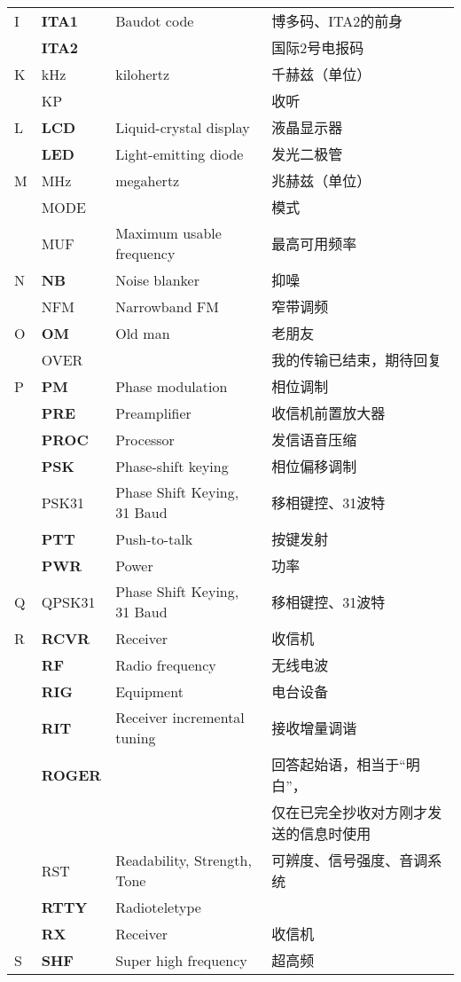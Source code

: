 \begin{longtable}[l]{llll}
I & \textbf{ITA1} & Baudot code & 博多码、ITA2的前身 \\
& \textbf{ITA2} & & 国际2号电报码 \\
K & kHz & kilohertz & 千赫兹（单位） \\
& KP & & 收听 \\
L & \textbf{LCD} & Liquid-crystal display & 液晶显示器 \\
& \textbf{LED} & Light-emitting diode & 发光二极管 \\
M & MHz & megahertz & 兆赫兹（单位） \\
& MODE & & 模式 \\
& MUF & Maximum usable frequency & 最高可用频率 \\
N & \textbf{NB} & Noise blanker & 抑噪 \\
& NFM & Narrowband FM & 窄带调频 \\
O & \textbf{OM} & Old man & 老朋友 \\%
& OVER & & 我的传输已结束，期待回复 \\
P & \textbf{PM} & Phase modulation & 相位调制 \\
& \textbf{PRE} & Preamplifier & 收信机前置放大器 \\
& \textbf{PROC} & Processor & 发信语音压缩 \\
& \textbf{PSK} & Phase-shift keying & 相位偏移调制 \\
& PSK31 & Phase Shift Keying, 31 Baud & 移相键控、31波特 \\
& \textbf{PTT} & Push-to-talk & 按键发射 \\
& \textbf{PWR} & Power & 功率 \\
Q & QPSK31 & Phase Shift Keying, 31 Baud & 移相键控、31波特 \\
R & \textbf{RCVR} & Receiver & 收信机 \\
& \textbf{RF} & Radio frequency & 无线电波 \\
& \textbf{RIG} & Equipment & 电台设备 \\
& \textbf{RIT} & Receiver incremental tuning & 接收增量调谐 \\
& \textbf{ROGER} & & 回答起始语，相当于“明白”， \\
& &  & 仅在已完全抄收对方刚才发送的信息时使用 \\
& RST & Readability, Strength, Tone & 可辨度、信号强度、音调系统 \\
& \textbf{RTTY} & Radioteletype & \\
& \textbf{RX} & Receiver & 收信机 \\
S & \textbf{SHF} & Super high frequency & 超高频 \\

\end{longtable}
